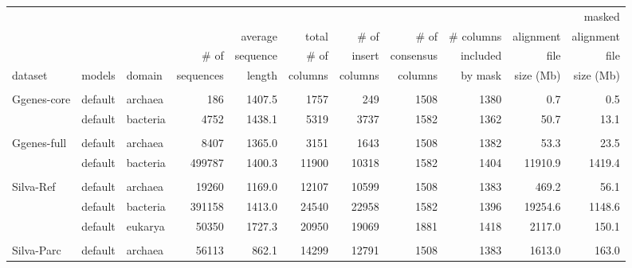 
\begin{table}[hb]
\begin{center}
  \scriptsize
  \begin{tabular}{lllrr|rrrr|rr} 
                &          &          &         &        &       &       &       &           &           & masked \\
                &          &          &         &average &total  & \# of & \# of & \# columns& alignment & alignment \\
                &          &          & \# of   &sequence&\# of  &insert &consensus&included & file      & file \\
dataset         & models   & domain   &sequences& length &columns&columns&columns&by mask    & size (Mb) & size (Mb) \\ \hline
& & & & & & & & & & \\ 
Ggenes-core     & default  & archaea  &     186 & 1407.5 &  1757 &   249 &  1508 &  1380 &      0.7 &      0.5 \\
                & default  & bacteria &    4752 & 1438.1 &  5319 &  3737 &  1582 &  1362 &     50.7 &     13.1 \\
& & & & & & & & & & \\ 
Ggenes-full     & default  & archaea  &    8407 & 1365.0 &  3151 &  1643 &  1508 &  1382 &     53.3 &     23.5 \\
                & default  & bacteria &  499787 & 1400.3 & 11900 & 10318 &  1582 &  1404 & 11910.9 &   1419.4 \\
& & & & & & & & & & \\ 
Silva-Ref       & default  & archaea  &   19260 & 1169.0 & 12107 & 10599 &  1508 &  1383 &    469.2 &     56.1 \\
                & default  & bacteria &  391158 & 1413.0 & 24540 & 22958 &  1582 &  1396 & 19254.6 &   1148.6 \\
                & default  & eukarya  &   50350 & 1727.3 & 20950 & 19069 &  1881 &  1418 &   2117.0 &    150.1 \\
& & & & & & & & & & \\ 
Silva-Parc      & default  & archaea  &   56113 &  862.1 & 14299 & 12791 &  1508 &  1383 &   1613.0 &    163.0 \\

\end{tabular}
\end{center}
\end{table}
